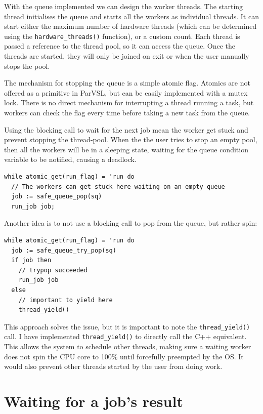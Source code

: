With the queue implemented we can design the worker threads. The starting thread
initialises the queue and starts all the workers as individual threads. It can start
either the maximum number of hardware threads (which can be determined using the
\texttt{hardware\_threads()} function), or a custom count. Each thread is passed a reference to
the thread pool, so it can access the queue. Once the threads are started, they will only
be joined on exit or when the user manually stops the pool.

The mechanism for stopping the queue is a simple atomic flag. Atomics are not offered as
a primitive in ParVSL, but can be easily implemented with a mutex lock. There is no direct
mechanism for interrupting a thread running a task, but workers can check the flag every time
before taking a new task from the queue.

Using the blocking call to wait for the next job mean the worker get stuck and prevent
stopping the thread-pool. When the the user tries to stop an empty pool, then all
the workers will be in a sleeping state, waiting for the queue condition variable to be
notified, causing a deadlock.

\begin{verbatim}
while atomic_get(run_flag) = 'run do
  // The workers can get stuck here waiting on an empty queue
  job := safe_queue_pop(sq)
  run_job job;
\end{verbatim}

Another idea is to not use a blocking call to pop from the queue, but rather spin:
\begin{verbatim}
while atomic_get(run_flag) = 'run do
  job := safe_queue_try_pop(sq)
  if job then
    // trypop succeeded
    run_job job
  else
    // important to yield here
    thread_yield()
\end{verbatim}

This approach solves the issue, but it is important to note the \texttt{thread\_yield()} call.
I have implemented \texttt{thread\_yield()} to directly call the C++ equivalent. This allows the
system to schedule other threads, making sure a waiting worker does not spin the CPU
core to 100\% until forcefully preempted by the OS. It would also prevent other threads
started by the user from doing work.

\section{Waiting for a job's result}


